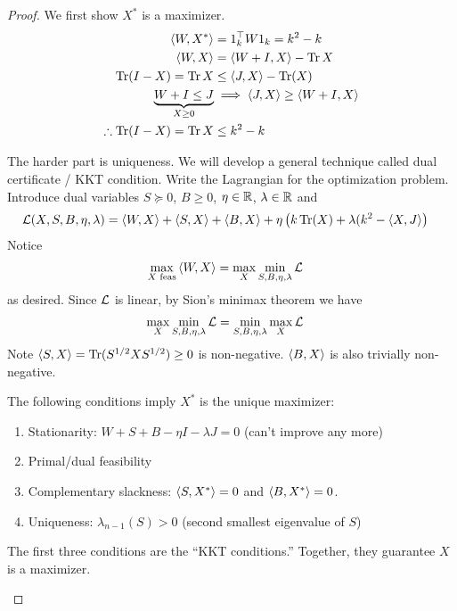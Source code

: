 \begin{proof}
    We first show $X^*$ is a maximizer.
    \begin{align}
        \braket{W, X^*} &= 1_k^\top W 1_k = k^2 - k \\
        \braket{W, X} &= \braket{W + I, X} - \operatorname{Tr} X \\
        \operatorname{Tr}(I - X) = \operatorname{Tr} X &\leq \braket{J, X} - \operatorname{Tr}(X) \\
        \underbrace{W + I \leq J}_{X \geq 0} &\implies \braket{J, X} \geq \braket{W + I, X} \\
        \therefore \operatorname{Tr}(I - X) = \operatorname{Tr} X &\leq k^2 - k
    \end{align}
    
    The harder part is uniqueness. We will develop a general technique called
    dual certificate / KKT condition.
    Write the Lagrangian for the optimization problem.
    Introduce dual variables $S \succeq 0$, $B \geq 0$,
    $\eta \in \mathbb{R}$, $\lambda \in \mathbb{R}$ and 
    \begin{align}
        \mathcal{L}(X, S, B, \eta, \lambda)
        &= \braket{W, X} + \braket{S, X} + \braket{B, X} + \eta\left(
            k \operatorname{Tr}(X) + \lambda (k^2 - \braket{X, J}
        \right)
    \end{align}
    Notice
    \begin{align}
        \max_{X\text{ feas}} \braket{W, X} &= \max_X \min_{S, B, \eta, \lambda} \mathcal{L}
    \end{align}
    as desired. Since $\mathcal{L}$ is linear, by Sion's minimax theorem we have
    \begin{align}
        \max_X \min_{S, B, \eta, \lambda} \mathcal{L}
        &= \min_{S, B, \eta, \lambda} \max_X \mathcal{L}
    \end{align}
    Note $\braket{S,X} = \operatorname{Tr}( S^{1/2} X S^{1/2} ) \geq 0$ is non-negative.
    $\braket{B, X}$ is also trivially non-negative.
    
    \begin{lemma}\label{lem:x-star-unique-maximizer}
        The following conditions imply $X^*$ is the unique maximizer:
        \begin{enumerate}
            \item Stationarity: $W + S + B - \eta I - \lambda J = 0$ (can't improve any more)
            \item Primal/dual feasibility
            \item Complementary slackness: $\braket{S, X^*} = 0$ and $\braket{B, X^*} = 0$.
            \item Uniqueness: $\lambda_{n-1}(S) > 0$ (second smallest eigenvalue of $S$)
        \end{enumerate}
        The first three conditions are the ``KKT conditions.'' Together,
        they guarantee $X$ is a maximizer.
    \end{lemma}
    

\end{proof}

